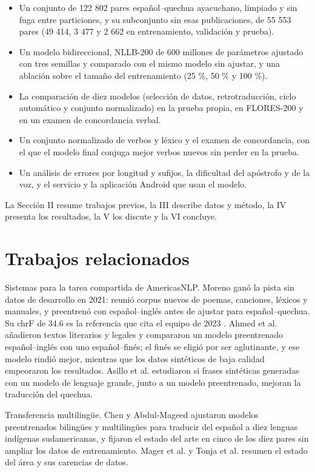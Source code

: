 \documentclass[conference]{IEEEtran}
\begin{document}
\begin{itemize}
\item Un conjunto de 122 802 pares español–quechua ayacuchano, limpiado y sin fuga entre particiones, y su subconjunto sin esas publicaciones, de 55 553 pares (49 414, 3 477 y 2 662 en entrenamiento, validación y prueba).
\item Un modelo bidireccional, NLLB-200 de 600 millones de parámetros ajustado con tres semillas y comparado con el mismo modelo sin ajustar, y una ablación sobre el tamaño del entrenamiento (25 \%, 50 \% y 100 \%).
\item La comparación de diez modelos (selección de datos, retrotraducción, ciclo automático y conjunto normalizado) en la prueba propia, en FLORES-200 y en un examen de concordancia verbal.
\item Un conjunto normalizado de verbos y léxico y el examen de concordancia, con el que el modelo final conjuga mejor verbos nuevos sin perder en la prueba.
\item Un análisis de errores por longitud y sufijos, la dificultad del apóstrofo y de la voz, y el servicio y la aplicación Android que usan el modelo.
\end{itemize}
La Sección II resume trabajos previos, la III describe datos y método, la IV presenta los resultados, la V los discute y la VI concluye.

\section{Trabajos relacionados}
Sistemas para la tarea compartida de AmericasNLP. Moreno \cite{r3} ganó la pista sin datos de desarrollo en 2021: reunió corpus nuevos de poemas, canciones, léxicos y manuales, y preentrenó con español–inglés antes de ajustar para español–quechua. Su chrF de 34.6 es la referencia que cita el equipo de 2023 \cite{r4}. Ahmed et al. \cite{r4} añadieron textos literarios y legales y compararon un modelo preentrenado español–inglés con uno español–finés; el finés se eligió por ser aglutinante, y ese modelo rindió mejor, mientras que los datos sintéticos de baja calidad empeoraron los resultados. Asillo et al. \cite{r5} estudiaron si frases sintéticas generadas con un modelo de lenguaje grande, junto a un modelo preentrenado, mejoran la traducción del quechua.

Transferencia multilingüe. Chen y Abdul-Mageed \cite{r6} ajustaron modelos preentrenados bilingües y multilingües para traducir del español a diez lenguas indígenas sudamericanas, y fijaron el estado del arte en cinco de los diez pares sin ampliar los datos de entrenamiento. Mager et al. \cite{r7} y Tonja et al. \cite{r8} resumen el estado del área y sus carencias de datos.
\end{document}
